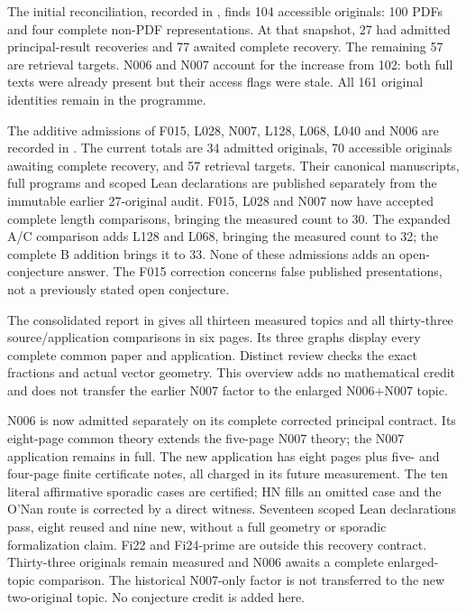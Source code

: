 \documentclass[11pt,a4paper]{article}
\begin{document}
The initial reconciliation, recorded in , finds 104
accessible originals: 100 PDFs and four complete non-PDF representations.
At that snapshot, 27 had admitted principal-result recoveries and 77 awaited
complete recovery. The remaining 57 are retrieval targets. N006 and N007 account for
the increase from 102: both full texts were already present but their access
flags were stale. All 161 original identities remain in the programme.

The additive admissions of F015, L028, N007, L128, L068, L040 and N006 are recorded in
. The current totals are 34 admitted originals,
70 accessible originals awaiting complete recovery, and 57 retrieval targets.
Their canonical manuscripts, full programs and scoped Lean declarations are
published separately from the immutable earlier 27-original audit. F015, L028 and
N007 now have accepted complete length comparisons, bringing the measured
count to 30. The expanded A/C comparison adds L128 and L068, bringing the
measured count to 32; the complete B addition brings it to 33. None of these admissions adds an open-conjecture
answer. The F015 correction concerns false published presentations, not a
previously stated open conjecture.

The consolidated report in  gives all thirteen measured
topics and all thirty-three source/application comparisons in six pages. Its
three graphs display every complete common paper and application. Distinct
review checks the exact fractions and actual vector geometry. This overview
adds no mathematical credit and does not transfer the earlier N007 factor
to the enlarged N006+N007 topic.

N006 is now admitted separately on its complete corrected principal contract.
Its eight-page common theory extends the five-page N007 theory; the N007
application remains in full. The new application has eight pages plus five-
and four-page finite certificate notes, all charged in its future measurement.
The ten literal affirmative sporadic cases are certified; HN fills an omitted
case and the O'Nan route is corrected by a direct witness. Seventeen scoped
Lean declarations pass, eight reused and nine new, without a full geometry
or sporadic formalization claim. Fi22 and Fi24-prime are outside this recovery
contract. Thirty-three originals remain measured and N006 awaits a complete
enlarged-topic comparison. The historical N007-only factor is not transferred
to the new two-original topic. No conjecture credit is added here.
\end{document}
